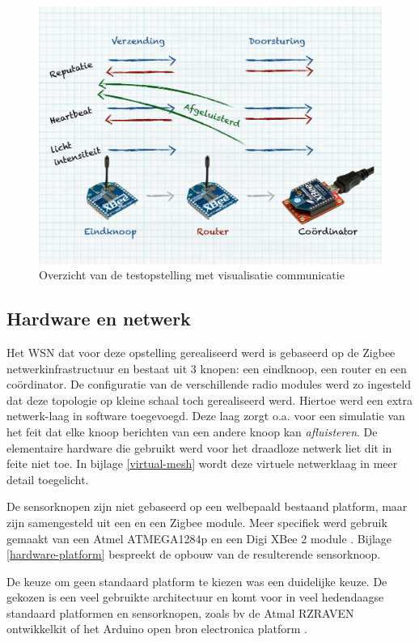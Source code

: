 \begin{figure}[ht]
  \centering
  \includegraphics[width=0.75\linewidth]{resources/setup.pdf}
  \caption{Overzicht van de testopstelling met visualisatie communicatie}
  \label{fig:setup}
\end{figure}

\vspace{-5mm}

\subsection{Hardware en netwerk}
\label{subsection:eval-hardware}

Het WSN dat voor deze opstelling gerealiseerd werd is gebaseerd op de Zigbee
netwerkinfrastructuur en bestaat uit 3 knopen: een eindknoop, een router en een
co\"ordinator. De configuratie van de verschillende radio modules werd zo
ingesteld dat deze topologie op kleine schaal toch gerealiseerd werd. Hiertoe
werd een extra netwerk-laag in software toegevoegd. Deze laag zorgt o.a. voor
een simulatie van het feit dat elke knoop berichten van een andere knoop kan
\emph{afluisteren}. De elementaire hardware die gebruikt werd voor het
draadloze netwerk liet dit in feite niet toe. In bijlage \ref{virtual-mesh}
wordt deze virtuele netwerklaag in meer detail toegelicht.

De sensorknopen zijn niet gebaseerd op een welbepaald bestaand platform, maar
zijn samengesteld uit een \mcu en een Zigbee module. Meer specifiek werd
gebruik gemaakt van een Atmel ATMEGA1284p \citep{datasheet:atmega1284p} en een
Digi XBee 2 module \citep{manual:xbee}. Bijlage \ref{hardware-platform}
bespreekt de opbouw van de resulterende sensorknoop.

De keuze om geen standaard platform te kiezen was een duidelijke keuze. De
gekozen \mcu is een veel gebruikte architectuur en komt voor in veel
hedendaagse standaard platformen en sensorknopen, zoals bv de Atmal RZRAVEN
ontwikkelkit \citep{manual:rzraven} of het Arduino open bron electronica
platform \citep{url:arduino}.


